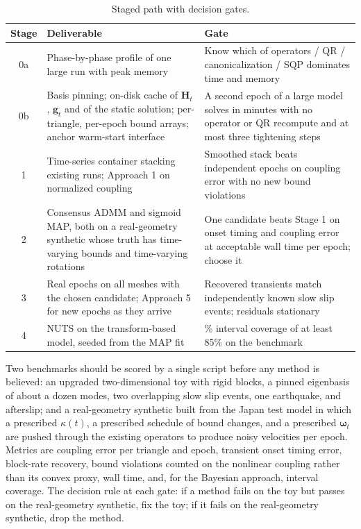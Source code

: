 \documentclass[11pt]{article}
\newcommand{\vect}[1]{\bm{#1}}
\newcommand{\mat}[1]{\mathbf{#1}}
\begin{document}
\begin{table}[h]
\centering
\small
\renewcommand{\arraystretch}{1.15}
\begin{tabular}{@{}c>{\raggedright\arraybackslash}p{7.2cm}>{\raggedright\arraybackslash}p{6.4cm}@{}}
\toprule
Stage & Deliverable & Gate \\
\midrule
0a & Phase-by-phase profile of one large run with peak memory & Know which of operators / QR / canonicalization / SQP dominates time and memory \\
0b & Basis pinning; on-disk cache of $\mat{H}_t$, $\vect{g}_t$ and of the static solution; per-triangle, per-epoch bound arrays; anchor warm-start interface & A second epoch of a large model solves in minutes with no operator or QR recompute and at most three tightening steps \\
1 & Time-series container stacking existing runs; Approach 1 on normalized coupling & Smoothed stack beats independent epochs on coupling error with no new bound violations \\
2 & Consensus ADMM and sigmoid MAP, both on a real-geometry synthetic whose truth has time-varying bounds and time-varying rotations & One candidate beats Stage 1 on onset timing and coupling error at acceptable wall time per epoch; choose it \\
3 & Real epochs on all meshes with the chosen candidate; Approach 5 for new epochs as they arrive & Recovered transients match independently known slow slip events; residuals stationary \\
4 & NUTS on the transform-based model, seeded from the MAP fit & 90\% interval coverage of at least 85\% on the benchmark \\
\bottomrule
\end{tabular}
\caption{Staged path with decision gates.}
\end{table}

Two benchmarks should be scored by a single script before any method is believed: an upgraded two-dimensional toy with rigid blocks, a pinned eigenbasis of about a dozen modes, two overlapping slow slip events, one earthquake, and afterslip; and a real-geometry synthetic built from the Japan test model in which a prescribed $\kappa(t)$, a prescribed schedule of bound changes, and a prescribed $\vect{\omega}_t$ are pushed through the existing operators to produce noisy velocities per epoch. Metrics are coupling error per triangle and epoch, transient onset timing error, block-rate recovery, bound violations counted on the nonlinear coupling rather than its convex proxy, wall time, and, for the Bayesian approach, interval coverage. The decision rule at each gate: if a method fails on the toy but passes on the real-geometry synthetic, fix the toy; if it fails on the real-geometry synthetic, drop the method.
\end{document}
